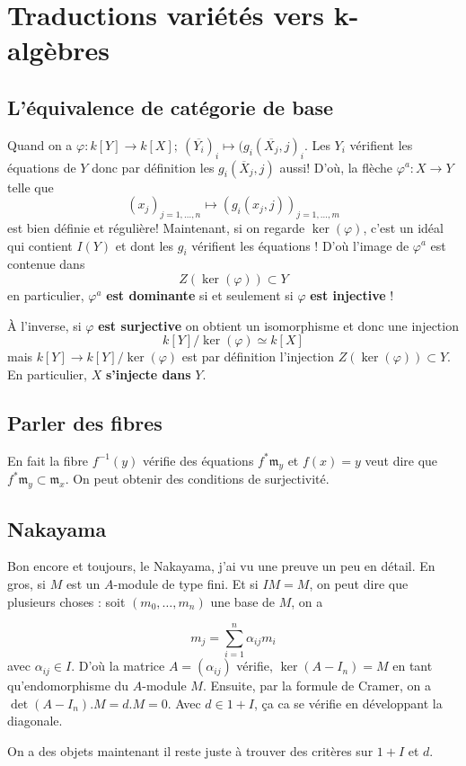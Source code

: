 \documentclass[a4paper,12pt]{book}
\newcommand{\m}{\mathfrak{m}}
\theoremstyle{plain}
\theoremstyle{definition}
\theoremstyle{remark}
\begin{document}
\chapter{Traductions variétés vers k-algèbres}
\section{L'équivalence de catégorie de base}
Quand on a $\varphi\colon k[Y]\to k[X];~(\overline{Y_i})_i\mapsto 
(g_i(\overline{X_j},j)_i$. Les $Y_i$ vérifient les équations de $Y$
donc par définition les $g_i(\overline{X}_j,j)$ aussi! D'où, la flèche 
$\varphi^a\colon X\to Y$ telle que 
\[(x_j)_{j=1,\ldots,n}\mapsto (g_i(x_j,j))_{j=1,\ldots, m}\]
est bien définie et régulière! Maintenant, si on regarde $\ker(\varphi)$,
c'est un idéal qui contient $I(Y)$ et dont les $g_i$ vérifient les 
équations ! D'où l'image de $\varphi^a$ est contenue dans 
\[Z(\ker(\varphi))\subset Y\]
en particulier, $\varphi^a$ \textbf{est dominante} si et seulement si 
$\varphi$ \textbf{est injective} !

À l'inverse, si $\varphi$ \textbf{est surjective} on obtient un
isomorphisme et donc une injection 
\[k[Y]/\ker(\varphi)\simeq k[X]\]
mais $k[Y]\to k[Y]/\ker(\varphi)$ est par définition l'injection 
$Z(\ker(\varphi))\subset Y$. En particulier, $X$ \textbf{s'injecte dans}
$Y$.
\section{Parler des fibres}
En fait la fibre $f^{-1}(y)$ vérifie des équations $f^*\m_y$ et 
$f(x)=y$ veut dire que $f^*\m_y\subset \m_x$. On peut obtenir 
des conditions de surjectivité.

\section{Nakayama}
Bon encore et toujours, le Nakayama, j'ai vu une preuve un peu en détail.
En gros, si $M$ est un $A$-module de type fini. Et si $IM=M$, on peut 
dire que plusieurs choses : soit $(m_0,\ldots, m_n)$ une base de $M$,
on a 

\[m_j = \sum_{i=1}^n \alpha_{ij}m_i\]
avec $\alpha_{ij}\in I$. D'où la matrice $A=(\alpha_{ij})$ vérifie,
$\ker(A-I_n)=M$ en tant qu'endomorphisme du $A$-module $M$. Ensuite, 
par la formule de Cramer, on a $\det(A-I_n).M=d.M=0$. Avec $d\in 1+I$, 
ça ca se vérifie en développant la diagonale. 

On a des objets maintenant il reste juste à trouver des critères sur
$1+I$ et $d$.
\end{document}
